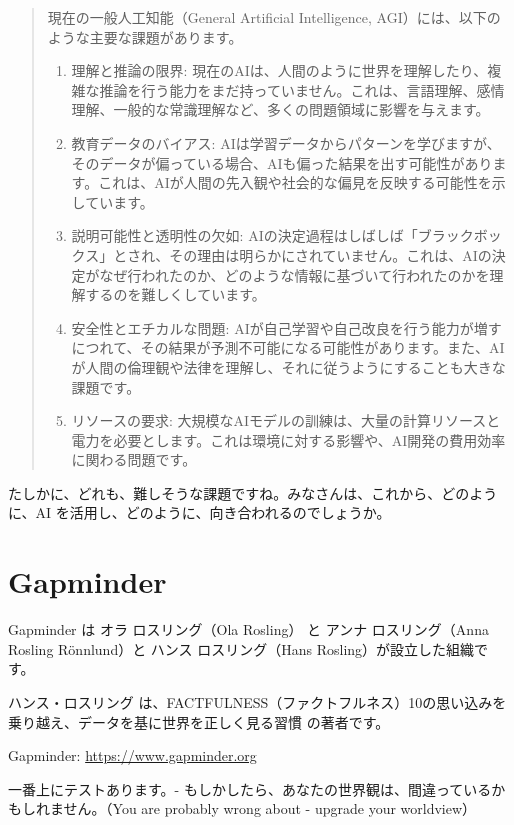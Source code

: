 \documentclass[
  xelatex, ja=standard]{bxjsbook}
\theoremstyle{definition}
\theoremstyle{definition}
\theoremstyle{definition}
\theoremstyle{definition}
\theoremstyle{remark}
\begin{document}
\begin{quote}
現在の一般人工知能（General Artificial Intelligence, AGI）には、以下のような主要な課題があります。

\begin{enumerate}
\def\labelenumi{\arabic{enumi}.}
\item
  理解と推論の限界: 現在のAIは、人間のように世界を理解したり、複雑な推論を行う能力をまだ持っていません。これは、言語理解、感情理解、一般的な常識理解など、多くの問題領域に影響を与えます。
\item
  教育データのバイアス: AIは学習データからパターンを学びますが、そのデータが偏っている場合、AIも偏った結果を出す可能性があります。これは、AIが人間の先入観や社会的な偏見を反映する可能性を示しています。
\item
  説明可能性と透明性の欠如: AIの決定過程はしばしば「ブラックボックス」とされ、その理由は明らかにされていません。これは、AIの決定がなぜ行われたのか、どのような情報に基づいて行われたのかを理解するのを難しくしています。
\item
  安全性とエチカルな問題: AIが自己学習や自己改良を行う能力が増すにつれて、その結果が予測不可能になる可能性があります。また、AIが人間の倫理観や法律を理解し、それに従うようにすることも大きな課題です。
\item
  リソースの要求: 大規模なAIモデルの訓練は、大量の計算リソースと電力を必要とします。これは環境に対する影響や、AI開発の費用効率に関わる問題です。
\end{enumerate}
\end{quote}

たしかに、どれも、難しそうな課題ですね。みなさんは、これから、どのように、AI を活用し、どのように、向き合われるのでしょうか。

\hypertarget{gapminder}{%
\section{Gapminder}\label{gapminder}}

Gapminder は オラ ロスリング（Ola Rosling） と アンナ ロスリング（Anna Rosling Rönnlund）と ハンス ロスリング（Hans Rosling）が設立した組織です。

ハンス・ロスリング は、FACTFULNESS（ファクトフルネス）10の思い込みを乗り越え、データを基に世界を正しく見る習慣 の著者です。

Gapminder: \url{https://www.gapminder.org}

一番上にテストあります。- もしかしたら、あなたの世界観は、間違っているかもしれません。（You are probably wrong about - upgrade your worldview）
\end{document}
